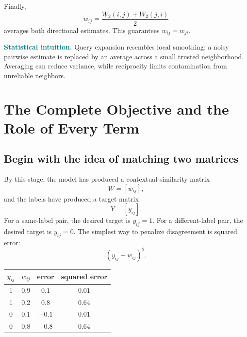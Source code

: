 \documentclass[11pt,oneside,openany]{book}
\theoremstyle{myplain}
\theoremstyle{definition}
\begin{document}
Finally,
\[
w_{ij}=\frac{W_2(i,j)+W_2(j,i)}{2}
\]
averages both directional estimates. This guarantees $w_{ij}=w_{ji}$.


\begin{center}
\end{center}
\noindent\textbf{\textcolor{teal}{Statistical intuition.}}
Query expansion resembles local smoothing: a noisy pairwise estimate is replaced by an average across a small trusted neighborhood. Averaging can reduce variance, while reciprocity limits contamination from unreliable neighbors.


\chapter{The Complete Objective and the Role of Every Term}
\label{chap:objective}

\section{Begin with the idea of matching two matrices}

By this stage, the model has produced a contextual-similarity matrix
\[
  W=[w_{ij}],
\]
and the labels have produced a target matrix
\[
  Y=[y_{ij}].
\]
For a same-label pair, the desired target is $y_{ij}=1$. For a different-label pair, the desired target is $y_{ij}=0$. The simplest way to penalize disagreement is squared error:
\[
  (y_{ij}-w_{ij})^2.
\]

\begin{center}
\begin{tabular}{cccc}
\toprule
$y_{ij}$ & $w_{ij}$ & error & squared error \\
\midrule
1 & 0.9 & $0.1$ & $0.01$ \\
1 & 0.2 & $0.8$ & $0.64$ \\
0 & 0.1 & $-0.1$ & $0.01$ \\
0 & 0.8 & $-0.8$ & $0.64$ \\
\bottomrule
\end{tabular}
\end{center}
\end{document}
